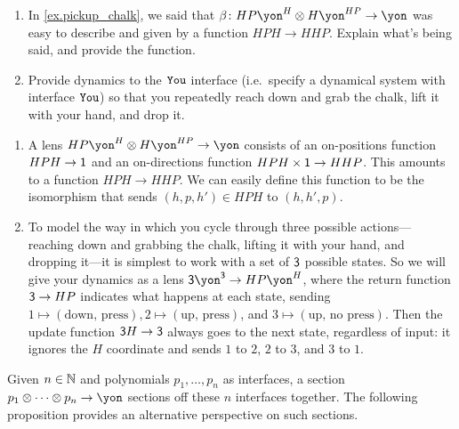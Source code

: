 \documentclass[Book-Poly]{subfiles}
\begin{document}
\begin{exercise}\label{exc.pickup_chalk}
\begin{enumerate}
	\item In \cref{ex.pickup_chalk}, we said that $\beta\colon HP\yon^H\otimes H\yon^{HP}\to\yon$ was easy to describe and given by a function $HPH\to HHP$. Explain what's being said, and provide the function.
	\item Provide dynamics to the $\texttt{You}$ interface (i.e.\ specify a dynamical system with interface $\texttt{You}$) so that you repeatedly reach down and grab the chalk, lift it with your hand, and drop it.
\qedhere
\end{enumerate}
\begin{solution}
\begin{enumerate}
    \item A lens $HP\yon^H \otimes H\yon^{HP} \to \yon$ consists of an on-positions function $HPH \to \textsf{1}$ and an on-directions function $HPH \times \textsf{1} \to HHP$.
    This amounts to a function $HPH \to HHP$.
    We can easily define this function to be the isomorphism that sends $(h,p,h') \in HPH$ to $(h,h',p)$.
    \item To model the way in which you cycle through three possible actions---reaching down and grabbing the chalk, lifting it with your hand, and dropping it---it is simplest to work with a set of $\textsf{3}$ possible states.
    So we will give your dynamics as a lens $\3\yon^\3 \to HP\yon^H$, where the return function $\textsf{3} \to HP$ indicates what happens at each state, sending $1 \mapsto (\text{down, press}), 2 \mapsto (\text{up, press})$, and $3 \mapsto (\text{up, no press})$.
    Then the update function $\textsf{3}H \to \textsf{3}$ always goes to the next state, regardless of input: it ignores the $H$ coordinate and sends $1$ to $2$, $2$ to $3$, and $3$ to $1$.
\end{enumerate}
\end{solution}
\end{exercise}

Given $n\in\mathbb{N}$ and polynomials $p_1,\ldots,p_n$ as interfaces, a section $p_1\otimes\cdots\otimes p_n\to\yon$ sections off these $n$ interfaces together.
The following proposition provides an alternative perspective on such sections.
\end{document}

